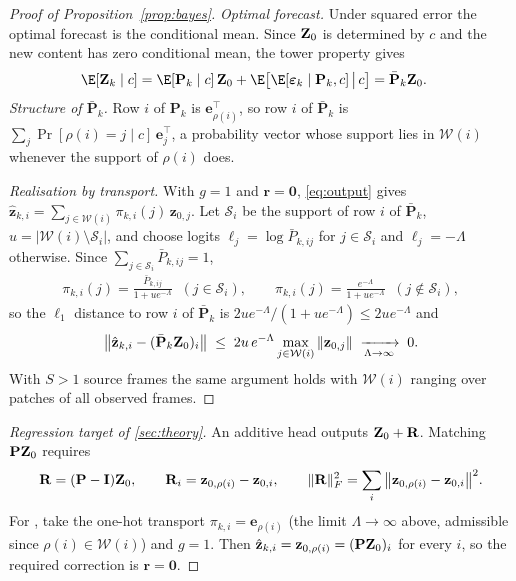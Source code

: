 \begin{proof}[Proof of Proposition~\ref{prop:bayes}]
\emph{Optimal forecast.} Under squared error the optimal forecast is the conditional mean. Since $\mathbf{Z}_0$ is determined
by $c$ and the new content has zero conditional mean, the tower property gives
\begin{align}
\E[\Z_k\mid c]
  &= \E[\mathbf{P}_k\mid c]\,\Z_0+\E\big[\E[\bm{\varepsilon}_k\mid\mathbf{P}_k,c]\,\big|\,c\big]
   = \bar{\mathbf{P}}_k\Z_0 .
\end{align}
\emph{Structure of $\bar{\mathbf{P}}_k$.} Row $i$ of $\mathbf{P}_k$ is $\mathbf{e}_{\rho(i)}^{\top}$, so row $i$ of
$\bar{\mathbf{P}}_k$ is $\sum_{j}\Pr[\rho(i)=j\mid c]\,\mathbf{e}_j^{\top}$, a probability vector whose support lies in
$\mathcal{W}(i)$ whenever the support of $\rho(i)$ does.

\emph{Realisation by transport.} With $g=1$ and $\mathbf{r}=\mathbf{0}$, \cref{eq:output} gives
$\hat{\mathbf{z}}_{k,i}=\sum_{j\in\mathcal{W}(i)}\pi_{k,i}(j)\,\mathbf{z}_{0,j}$. Let $\mathcal{S}_i$ be the support of
row $i$ of $\bar{\mathbf{P}}_k$, $u=|\mathcal{W}(i)\setminus\mathcal{S}_i|$, and choose logits
$\ell_j=\log\bar{P}_{k,ij}$ for $j\in\mathcal{S}_i$ and $\ell_j=-\Lambda$ otherwise. Since $\sum_{j\in\mathcal{S}_i}\bar{P}_{k,ij}=1$,
\begin{align}
\pi_{k,i}(j)=\frac{\bar{P}_{k,ij}}{1+u e^{-\Lambda}}\;\;(j\in\mathcal{S}_i),\qquad
\pi_{k,i}(j)=\frac{e^{-\Lambda}}{1+u e^{-\Lambda}}\;\;(j\notin\mathcal{S}_i),
\end{align}
so the $\ell_1$ distance to row $i$ of $\bar{\mathbf{P}}_k$ is $2ue^{-\Lambda}/(1+ue^{-\Lambda})\le 2ue^{-\Lambda}$ and
\begin{align}
\big\|\hat{\mathbf{z}}_{k,i}-(\bar{\mathbf{P}}_k\mathbf{Z}_0)_i\big\|\;\le\;2u\,e^{-\Lambda}\max_{j\in\mathcal{W}(i)}\|\mathbf{z}_{0,j}\|
\;\xrightarrow[\Lambda\to\infty]{}\;0 .
\end{align}
With $S>1$ source frames the same argument holds with $\mathcal{W}(i)$ ranging over patches of all observed frames.
\end{proof}

\begin{proof}[Regression target of \cref{sec:theory}]
An additive head outputs $\mathbf{Z}_0+\mathbf{R}$. Matching $\mathbf{P}\mathbf{Z}_0$ requires
\begin{align}
\mathbf{R}=(\mathbf{P}-\mathbf{I})\mathbf{Z}_0,\qquad
\mathbf{R}_{i}=\mathbf{z}_{0,\rho(i)}-\mathbf{z}_{0,i},\qquad
\|\mathbf{R}\|_F^2=\sum_i\big\|\mathbf{z}_{0,\rho(i)}-\mathbf{z}_{0,i}\big\|^2 .
\end{align}
For \ours{}, take the one-hot transport $\pi_{k,i}=\mathbf{e}_{\rho(i)}$ (the limit $\Lambda\to\infty$ above, admissible since
$\rho(i)\in\mathcal{W}(i)$) and $g=1$. Then $\hat{\mathbf{z}}_{k,i}=\mathbf{z}_{0,\rho(i)}=(\mathbf{P}\mathbf{Z}_0)_i$ for every $i$,
so the required correction is $\mathbf{r}=\mathbf{0}$.
\end{proof}

